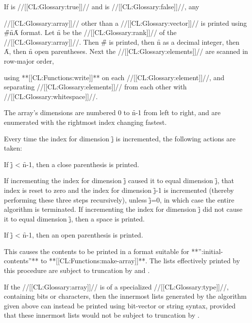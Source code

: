 
If   is //[[CL:Glossary:true]]// 
and  is //[[CL:Glossary:false]]//,
any

//[[CL:Glossary:array]]// other than a //[[CL:Glossary:vector]]// is printed
using \f{\#}\f{n}\f{A} format.
Let \f{n} be the //[[CL:Glossary:rank]]// of the //[[CL:Glossary:array]]//.
Then \f{\#} is printed, then \f{n} as a decimal integer,
then \f{A}, then \f{n} open parentheses.  
Next the //[[CL:Glossary:elements]]// are scanned in row-major order,

using **[[CL:Functions:write]]** on each //[[CL:Glossary:element]]//, 
and separating //[[CL:Glossary:elements]]// from each other with //[[CL:Glossary:whitespace]]//.


The array's dimensions are numbered 0 to \f{n}-1 from left to right,
and are enumerated with the rightmost index changing fastest.


Every time the index for dimension \f{j} is incremented,
the following actions are taken:


\beginlist
\itemitem{\bull}
If \f{j} < \f{n}-1, then a close parenthesis is printed.


\itemitem{\bull}
If incrementing the index for dimension \f{j} caused it to equal
dimension \f{j}, that index is reset to zero and the
index for dimension \f{j}-1 is incremented (thereby performing these three steps recursively),
unless \f{j}=0, in which case the entire algorithm is terminated.
If incrementing the index for dimension \f{j} did not cause it to
equal dimension \f{j}, then a space is printed.


\itemitem{\bull}
If \f{j} < \f{n}-1, then an open parenthesis is printed.
\endlist

This causes the contents to be printed in a format suitable for
**'':initial-contents''** to **[[CL:Functions:make-array]]**.
The lists effectively printed by this procedure are subject to
truncation by  and .


If the //[[CL:Glossary:array]]// 
is of a specialized //[[CL:Glossary:type]]//, containing bits or characters,
then the innermost lists generated by the algorithm given above can instead
be printed using bit-vector or string syntax, provided that these innermost
lists would not be subject to truncation by .  


















